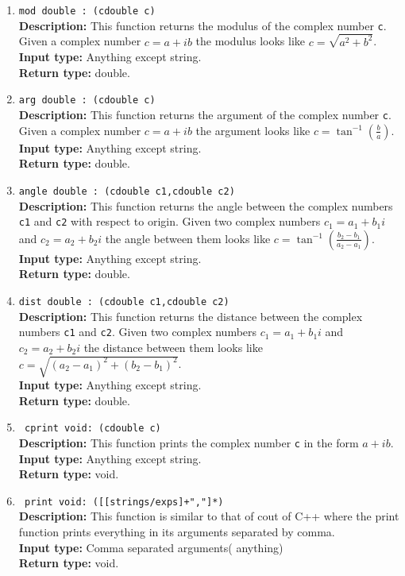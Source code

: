 \documentclass[12pt]{article}
\begin{document}
\begin{enumerate}
    \item \texttt{mod double : (cdouble c)} \\ 
    \textbf{Description:} This function returns the modulus of the complex number \texttt{c}. Given a complex number $c=a+ib$ the modulus looks like $c=\sqrt{a^2+b^2}$. \\
    \textbf{Input type:} Anything except string. \\
    \textbf{Return type:} double.
    \item \texttt{arg double : (cdouble c)} \\ 
    \textbf{Description:} This function returns the argument of the complex number \texttt{c}. Given a complex number $c=a+ib$ the argument looks like $c=\tan^{-1}(\frac{b}{a})$. \\
    \textbf{Input type:} Anything except string. \\
    \textbf{Return type:} double.
    \item \texttt{angle double : (cdouble c1,cdouble c2)} \\
    \textbf{Description:} This function returns the angle between the complex numbers \texttt{c1} and \texttt{c2} with respect to origin. Given two complex numbers $c_1=a_1+b_1i$ and $c_2=a_2+b_2i$ the angle between them looks like $c=\tan^{-1}(\frac{b_2-b_1}{a_2-a_1})$.\\
    \textbf{Input type:} Anything except string. \\
    \textbf{Return type:} double.
    \item \texttt{dist double : (cdouble c1,cdouble c2)} \\
    \textbf{Description:} This function returns the distance between the complex numbers \texttt{c1} and \texttt{c2}. Given two complex numbers $c_1=a_1+b_1i$ and $c_2=a_2+b_2i$ the distance between them looks like $c=\sqrt{(a_2-a_1)^2+(b_2-b_1)^2}$.\\
    \textbf{Input type:} Anything except string. \\
    \textbf{Return type:} double.
    \item \texttt{ cprint void: (cdouble c)} \\
    \textbf{Description:} This function prints the complex number \texttt{c} in the form $a+ib$.\\
    \textbf{Input type:} Anything except string. \\
    \textbf{Return type:} void.

    \item \texttt{ print void: ([[strings/exps]+","]*)} \\
    \textbf{Description:} This function is similar to that of cout of C++ where the print function prints everything in its arguments separated by comma.\\
    \textbf{Input type:} Comma separated arguments( anything) \\
    \textbf{Return type:} void.
\end{enumerate}
\end{document}
